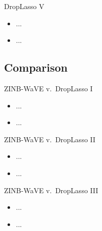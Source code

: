 \documentclass{beamer}
\begin{document}

\begin{frame}{DropLasso V}

\begin{itemize}
  \itemsep12pt
  \item ...
  \item ...
\end{itemize}

\end{frame}

\subsection{Comparison}

\begin{frame}{ZINB-WaVE v.~DropLasso I}

\begin{itemize}
  \itemsep12pt
  \item ...
  \item ...
\end{itemize}

\end{frame}


\begin{frame}{ZINB-WaVE v.~DropLasso II}

\begin{itemize}
  \itemsep12pt
  \item ...
  \item ...
\end{itemize}

\end{frame}


\begin{frame}{ZINB-WaVE v.~DropLasso III}

\begin{itemize}
  \itemsep12pt
  \item ...
  \item ...
\end{itemize}

\end{frame}
\end{document}
